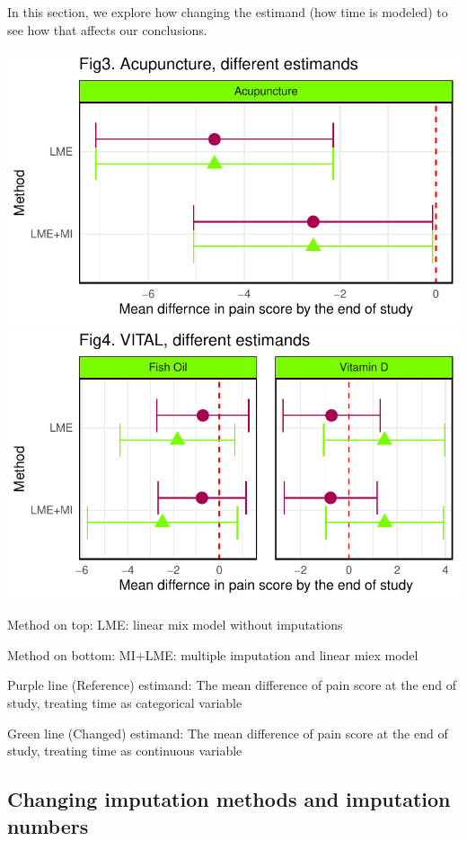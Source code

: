 \documentclass{article}
\newcommand{\pandocbounded}[1]{#1}
\begin{document}
In this section, we explore how changing the estimand (how time is
modeled) to see how that affects our conclusions.

\pandocbounded{\includegraphics[keepaspectratio]{Final_Report_files/figure-latex/unnamed-chunk-37-1.pdf}}
\pandocbounded{\includegraphics[keepaspectratio]{Final_Report_files/figure-latex/unnamed-chunk-37-2.pdf}}

Method on top: LME: linear mix model without imputations

Method on bottom: MI+LME: multiple imputation and linear miex model

Purple line (Reference) estimand: The mean difference of pain score at
the end of study, treating time as categorical variable

Green line (Changed) estimand: The mean difference of pain score at the
end of study, treating time as continuous variable

\subsection{Changing imputation methods and imputation
numbers}\label{changing-imputation-methods-and-imputation-numbers}
\end{document}
